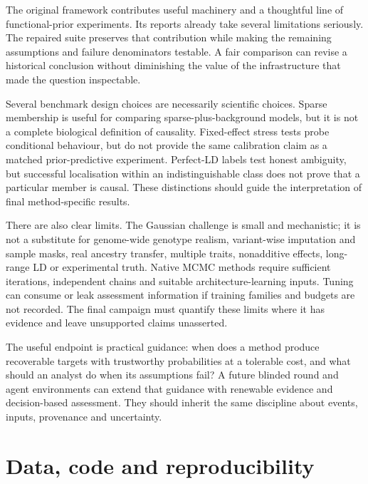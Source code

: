 \documentclass[
  british,
  10pt,
]{article}
\begin{document}
The original framework contributes useful machinery and a thoughtful
line of functional-prior experiments. Its reports already take several
limitations seriously. The repaired suite preserves that contribution
while making the remaining assumptions and failure denominators
testable. A fair comparison can revise a historical conclusion without
diminishing the value of the infrastructure that made the question
inspectable.

Several benchmark design choices are necessarily scientific choices.
Sparse membership is useful for comparing sparse-plus-background models,
but it is not a complete biological definition of causality.
Fixed-effect stress tests probe conditional behaviour, but do not
provide the same calibration claim as a matched prior-predictive
experiment. Perfect-LD labels test honest ambiguity, but successful
localisation within an indistinguishable class does not prove that a
particular member is causal. These distinctions should guide the
interpretation of final method-specific results.

There are also clear limits. The Gaussian challenge is small and
mechanistic; it is not a substitute for genome-wide genotype realism,
variant-wise imputation and sample masks, real ancestry transfer,
multiple traits, nonadditive effects, long-range LD or experimental
truth. Native MCMC methods require sufficient iterations, independent
chains and suitable architecture-learning inputs. Tuning can consume or
leak assessment information if training families and budgets are not
recorded. The final campaign must quantify these limits where it has
evidence and leave unsupported claims unasserted.

The useful endpoint is practical guidance: when does a method produce
recoverable targets with trustworthy probabilities at a tolerable cost,
and what should an analyst do when its assumptions fail? A future
blinded round and agent environments can extend that guidance with
renewable evidence and decision-based assessment. They should inherit
the same discipline about events, inputs, provenance and uncertainty.

\section{Data, code and
reproducibility}\label{data-code-and-reproducibility}
\end{document}
